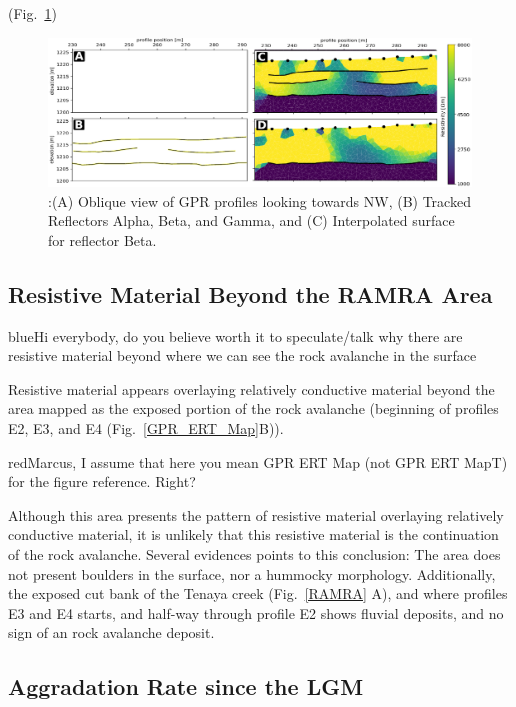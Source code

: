 \documentclass[5p]{elsarticle}
\newcommand{\COMON}{\begin{color}{blue}}
\newcommand{\COMOFF}{\end{color}}
\newcommand{\alon}{\begin{color}{red}}
\newcommand{\aloff}{\end{color}}
\begin{document}
				(Fig.~\ref{Combined_ABCD})			

                                \begin{figure}[h]

	\includegraphics[width=\textwidth]{Figures/Combined_ABCD.pdf}
		\caption{:(A) Oblique view of GPR profiles looking towards NW, (B) Tracked Reflectors Alpha, Beta, and Gamma, and (C) Interpolated surface for reflector Beta. \label{Combined_ABCD}}

								   \end{figure}



\subsection{Resistive Material Beyond the RAMRA Area}

\COMON Hi everybody, do you believe worth it to speculate/talk why there are resistive material beyond where we can see the rock avalanche in the surface \COMOFF

Resistive material appears overlaying relatively conductive material
beyond the area mapped as the exposed portion of the rock avalanche
(beginning of profiles E2, E3, and E4
(Fig.~\ref{GPR_ERT_Map}B)). \alon Marcus, I assume that here you mean
GPR ERT Map (not GPR ERT MapT) for the figure reference. Right? \aloff 

Although this area presents the pattern of resistive material overlaying relatively conductive material, it is unlikely that this resistive material is the continuation of the rock avalanche. Several evidences points to this conclusion: The area does not present boulders in the surface, nor a hummocky morphology. Additionally, the exposed cut bank of the Tenaya creek (Fig.~\ref{RAMRA} A), and where profiles E3 and E4 starts, and half-way through profile E2 shows fluvial deposits, and no sign of an rock avalanche deposit.  


\subsection{Aggradation Rate since the LGM}
\end{document}
